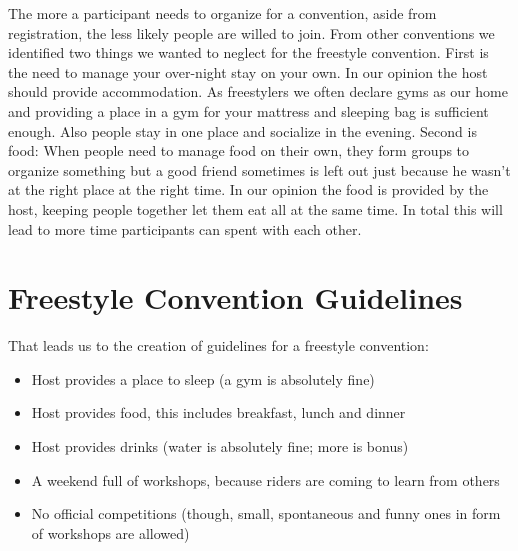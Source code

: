 \documentclass[11pt]{report}
\begin{document}
The more a participant needs to organize for a convention, aside from registration, 
the less likely people are willed to join. From other conventions we identified two 
things we wanted to neglect for the freestyle convention.
First is the need to manage your over-night stay on your own. In our opinion the 
host should provide accommodation. As freestylers we often declare gyms as our 
home and providing a place in a gym for your mattress and sleeping bag is 
sufficient enough. Also people stay in one place and socialize in the evening.
Second is food: When people need to manage food on their own, they form 
groups to organize something but a good friend sometimes is left out just because 
he wasn't at the right place at the right time. In our opinion the food is 
provided by the host, keeping people together let them eat all at the same time. 
In total this will lead to more time participants can spent with each other.

\section{Freestyle Convention Guidelines}

That leads us to the creation of guidelines for a freestyle convention:

\begin{itemize}
	\item Host provides a place to sleep (a gym is absolutely fine)
	\item Host provides food, this includes breakfast, lunch and dinner
	\item Host provides drinks (water is absolutely fine; more is bonus)
	\item A weekend full of workshops, because riders are coming to learn from 
	others
	\item No official competitions (though, small, spontaneous and funny ones in 
	form of workshops are allowed)
\end{itemize}
\end{document}
